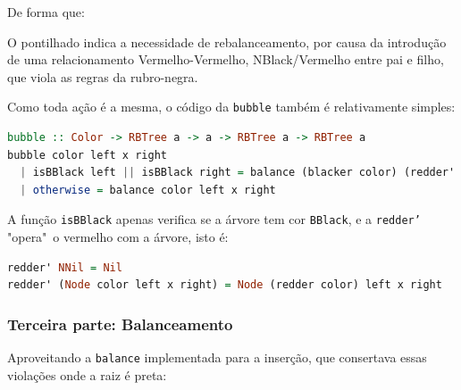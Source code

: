 De forma que:

\begin{figure}[!ht]
	\centering
\end{figure}
\FloatBarrier

O pontilhado indica a necessidade de rebalanceamento, por causa da introdução de uma relacionamento Vermelho-Vermelho, NBlack/Vermelho entre pai e filho, que viola as regras da rubro-negra.

Como toda ação é a mesma, o código da \texttt{bubble} também é relativamente simples:

\begin{lstlisting}[language=Haskell]
bubble :: Color -> RBTree a -> a -> RBTree a -> RBTree a
bubble color left x right
  | isBBlack left || isBBlack right = balance (blacker color) (redder' left) x (redder' right)
  | otherwise = balance color left x right
\end{lstlisting}
\FloatBarrier

A função \texttt{isBBlack} apenas verifica se a árvore tem cor \texttt{BBlack}, e a \texttt{redder'} "opera"\ o vermelho com a árvore, isto é:

\begin{lstlisting}[language=Haskell]
redder' NNil = Nil
redder' (Node color left x right) = Node (redder color) left x right
\end{lstlisting}
\FloatBarrier

\subsubsection{Terceira parte: Balanceamento}

Aproveitando a \texttt{balance} implementada para a inserção, que consertava essas violações onde a raiz é preta:

\begin{figure}[!ht]
	\centering
\end{figure}
\FloatBarrier

